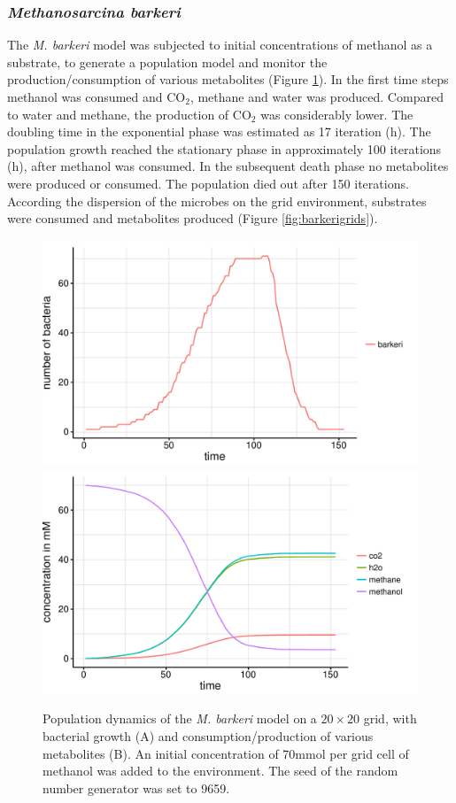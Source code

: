 \subsubsection{\textit{Methanosarcina barkeri}}
The \textit{M. barkeri} model was subjected to initial concentrations of methanol as a substrate, to generate a population model and monitor the production/consumption of various metabolites (Figure \hyperref[fig:barkerisg]{\ref{fig:barkerisg}}). In the first time steps methanol was consumed and CO$_2$, methane and water was produced. Compared to water and methane, the production of CO$_2$ was considerably lower.
The doubling time in the exponential phase was estimated as 17 iteration (h).
The population growth reached the stationary phase in approximately 100 iterations (h), after methanol was consumed. In the subsequent death phase no metabolites were produced or consumed. The population died out after 150 iterations.
According the dispersion of the microbes on the grid environment, substrates were consumed and metabolites produced (Figure \hyperref[fig:barkerigrids]{\ref{fig:barkerigrids}}).
\begin{figure}[h!]
  \centering
    \includegraphics[scale=0.45]{../results/barkeri_20x20_seed9659_growth.pdf}
    \includegraphics[scale=0.45]{../results/barkeri_20x20_seed9659_subs.pdf}
  \caption{Population dynamics of the \emph{M. barkeri} model on a $20\times20$ grid, with bacterial growth (A) and consumption/production of various metabolites (B). An initial concentration of 70\;mmol per grid cell of methanol was added to the environment. The seed of the random number generator was set to 9659.}
  \label{fig:barkerisg}
\end{figure}
